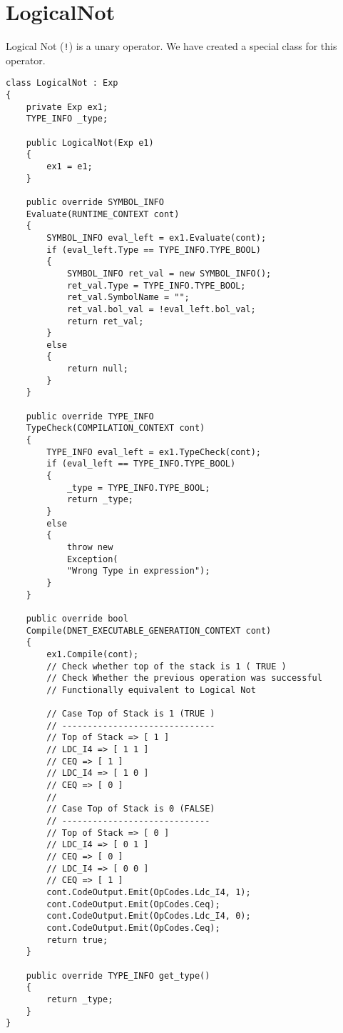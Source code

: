 \section{LogicalNot}
Logical Not (\texttt{!}) is a unary operator. We have created a special class for this operator.
\lstset{style=csharp}
\begin{lstlisting}
class LogicalNot : Exp
{
	private Exp ex1;
	TYPE_INFO _type;
	
	public LogicalNot(Exp e1)
	{
		ex1 = e1;
	}
	
	public override SYMBOL_INFO 
	Evaluate(RUNTIME_CONTEXT cont)
	{
		SYMBOL_INFO eval_left = ex1.Evaluate(cont);
		if (eval_left.Type == TYPE_INFO.TYPE_BOOL)
		{
			SYMBOL_INFO ret_val = new SYMBOL_INFO();
			ret_val.Type = TYPE_INFO.TYPE_BOOL;
			ret_val.SymbolName = "";
			ret_val.bol_val = !eval_left.bol_val;
			return ret_val;
		}
		else
		{
			return null;
		}
	}
 
	public override TYPE_INFO 
	TypeCheck(COMPILATION_CONTEXT cont)
	{
		TYPE_INFO eval_left = ex1.TypeCheck(cont);
		if (eval_left == TYPE_INFO.TYPE_BOOL)
		{
			_type = TYPE_INFO.TYPE_BOOL;
			return _type;
		}
		else
		{
			throw new 
			Exception(
			"Wrong Type in expression");
		}
	}

	public override bool 
	Compile(DNET_EXECUTABLE_GENERATION_CONTEXT cont)
	{
		ex1.Compile(cont);
		// Check whether top of the stack is 1 ( TRUE )
		// Check Whether the previous operation was successful
		// Functionally equivalent to Logical Not

		// Case Top of Stack is 1 (TRUE )
		// ------------------------------
		// Top of Stack => [ 1 ]
		// LDC_I4 => [ 1 1 ]
		// CEQ => [ 1 ]
		// LDC_I4 => [ 1 0 ]
		// CEQ => [ 0 ]
		//
		// Case Top of Stack is 0 (FALSE)
		// -----------------------------
		// Top of Stack => [ 0 ]
		// LDC_I4 => [ 0 1 ]
		// CEQ => [ 0 ]
		// LDC_I4 => [ 0 0 ]
		// CEQ => [ 1 ]
		cont.CodeOutput.Emit(OpCodes.Ldc_I4, 1);
		cont.CodeOutput.Emit(OpCodes.Ceq);
		cont.CodeOutput.Emit(OpCodes.Ldc_I4, 0);
		cont.CodeOutput.Emit(OpCodes.Ceq);
		return true;
	}
	
	public override TYPE_INFO get_type()
	{
		return _type;
	}
}
\end{lstlisting}
